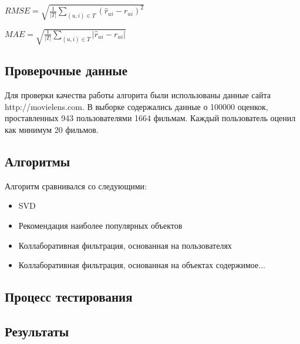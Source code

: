 \documentclass[12pt]{article} %
\begin{document}
$RMSE=\sqrt{\frac{1}{|T|}\sum_{(u,i)\in T} (\hat{r}_{ui} - r_{ui})^2}$

$MAE=\sqrt{\frac{1}{|T|}\sum_{(u,i)\in T} |\hat{r}_{ui} - r_{ui}|}$

\subsection{Проверочные данные}
Для проверки качества работы алгорита были использованы данные сайта http://movielens.com. В выборке содержались данные о 100000 оценкок, проставленных  943 пользователями 
1664 фильмам. Каждый пользователь оценил как минимум 20 фильмов. 
\subsection{Алгоритмы}
Алгоритм сравнивался со следующими:
\begin{itemize}
\item SVD
\item Рекомендация наиболее популярных объектов
\item Коллаборативная фильтрация, основанная на пользователях
\item Коллаборативная фильтрация, основанная на объектах
содержимое...
\end{itemize}

\subsection{Процесс тестирования}

\subsection{Результаты}
\end{document}
